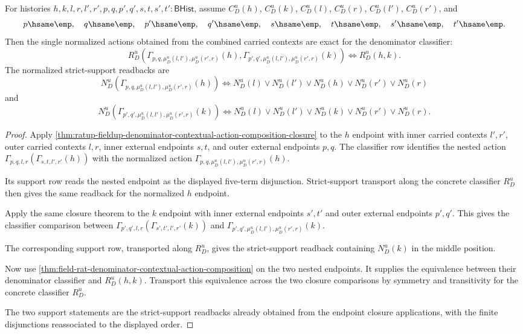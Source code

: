 \begin{theorem}
\label{thm:field-rat-denominator-normalized-contextual-action-exactness}
For histories $h,k,l,r,l',r',p,q,p',q',s,t,s',t':\mathsf{BHist}$, assume
$C_D^u(h)$, $C_D^u(k)$, $C_D^u(l)$, $C_D^u(r)$, $C_D^u(l')$,
$C_D^u(r')$, and
$$
p\hsame\emp,\quad q\hsame\emp,\quad p'\hsame\emp,\quad q'\hsame\emp,
\quad s\hsame\emp,\quad t\hsame\emp,\quad s'\hsame\emp,\quad t'\hsame\emp.
$$
Then the single normalized actions obtained from the combined carried contexts
are exact for the denominator classifier:
$$
R_D^u(\Gamma_{p,q,\mu_D^u(l,l'),\mu_D^u(r',r)}(h),
\Gamma_{p',q',\mu_D^u(l,l'),\mu_D^u(r',r)}(k))
\Longleftrightarrow R_D^u(h,k).
$$
The normalized strict-support readbacks are
$$
N_D^u(\Gamma_{p,q,\mu_D^u(l,l'),\mu_D^u(r',r)}(h))
\Longleftrightarrow
N_D^u(l)\lor N_D^u(l')\lor N_D^u(h)\lor N_D^u(r')\lor N_D^u(r)
$$
and
$$
N_D^u(\Gamma_{p',q',\mu_D^u(l,l'),\mu_D^u(r',r)}(k))
\Longleftrightarrow
N_D^u(l)\lor N_D^u(l')\lor N_D^u(k)\lor N_D^u(r')\lor N_D^u(r).
$$
\end{theorem}
\begin{proof}
Apply
\autoref{thm:ratup-fieldup-denominator-contextual-action-composition-closure}
to the $h$ endpoint with inner carried contexts $l',r'$, outer carried contexts
$l,r$, inner external endpoints $s,t$, and outer external endpoints $p,q$. The
classifier row identifies the nested action
$\Gamma_{p,q,l,r}(\Gamma_{s,t,l',r'}(h))$ with the normalized action
$\Gamma_{p,q,\mu_D^u(l,l'),\mu_D^u(r',r)}(h)$.

Its support row reads the nested endpoint as the displayed five-term
disjunction. Strict-support transport along the concrete classifier $R_D^u$
then gives the same readback for the normalized $h$ endpoint.

Apply the same closure theorem to the $k$ endpoint with inner external
endpoints $s',t'$ and outer external endpoints $p',q'$. This gives the
classifier comparison between
$\Gamma_{p',q',l,r}(\Gamma_{s',t',l',r'}(k))$ and
$\Gamma_{p',q',\mu_D^u(l,l'),\mu_D^u(r',r)}(k)$.

The corresponding support row, transported along $R_D^u$, gives the
strict-support readback containing $N_D^u(k)$ in the middle position.

Now use
\autoref{thm:field-rat-denominator-contextual-action-composition} on the two
nested endpoints. It supplies the equivalence between their denominator
classifier and $R_D^u(h,k)$. Transport this equivalence across the two closure
comparisons by symmetry and transitivity for the concrete classifier $R_D^u$.

The two support statements are the strict-support readbacks already obtained
from the endpoint closure applications, with the finite disjunctions
reassociated to the displayed order.
\end{proof}

